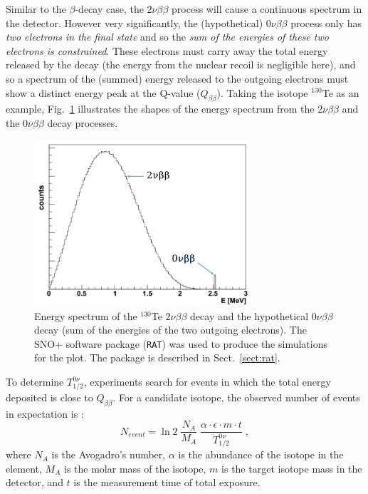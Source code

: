 Similar to the $\beta$-decay case, the $2\nu\beta\beta$ process will cause a continuous spectrum in the detector. However very significantly, the (hypothetical) $0\nu\beta\beta$ process only has {\em two electrons in the final state} and so the {\em sum of the energies of these two electrons is constrained}. These electrons must carry away the total energy released by the decay (the energy from the nuclear recoil is negligible here), and so a spectrum of the (summed) energy released to the outgoing electrons must show a distinct energy peak at the Q-value ($Q_{\beta\beta}$). Taking the isotope $^{130}$Te as an example, Fig.~\ref{te130energy} illustrates the shapes of the energy spectrum from the $2\nu\beta\beta$ and the $0\nu\beta\beta$ decay processes.
\begin{figure}[htbp]
	\centering	
	\includegraphics[width=8cm]{Te130_energy0vbb.png}
	\caption[Energy spectrum of the $^{130}$Te $2\nu\beta\beta$ decay and the hypothetical $0\nu\beta\beta$ decay.]{Energy spectrum of the $^{130}$Te $2\nu\beta\beta$ decay and the hypothetical $0\nu\beta\beta$ decay (sum of the energies of the two outgoing electrons). The SNO+ software package (\texttt{RAT}) was used to produce the simulations for the plot. The package is described in Sect.~\ref{sect:rat}.	\label{te130energy}}
\end{figure}

To determine $T^{0\nu}_{1/2}$, experiments search for events in which the total energy deposited is close to $Q_{\beta\beta}$. For a candidate isotope, the observed number of events in expectation is \cite{zuber2020neutrino}: 
\begin{equation}
N_{event} = \ln 2 \; \frac{N_A}{M_A} \; \frac{\alpha\cdot\epsilon\cdot m\cdot t}{T^{0\nu}_{1/2}}\; ,
\end{equation}
where $N_A$ is the Avogadro's number, $\alpha$ is the abundance of the isotope in the element, $M_A$ is the molar mass of the isotope, $m$ is the target isotope mass in the detector, and $t$ is the measurement time of total exposure.

